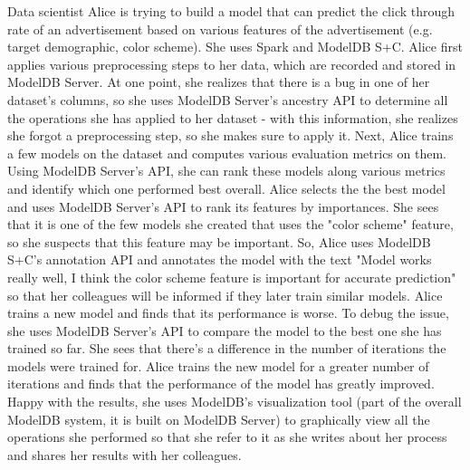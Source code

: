 Data scientist Alice is trying to build a model that can predict the click through rate
of an advertisement based on various features of the advertisement (e.g. target demographic,
color scheme). She uses Spark and ModelDB S+C. Alice first applies various preprocessing steps to
her data, which are recorded and stored in ModelDB Server. At one point, she realizes that there
is a bug in one of her dataset's columns, so she uses ModelDB Server's ancestry API to determine
all the operations she has applied to her dataset - with this information, she realizes she forgot a preprocessing step, so
she makes sure to apply it.
Next, Alice trains a few models on the dataset and computes various evaluation metrics on them. Using
ModelDB Server's API, she can rank these models along various metrics and identify which one performed
best overall. Alice selects the the best model and uses ModelDB Server's API to 
rank its features by importances. She sees that it is one of the few 
models she created that uses the "color scheme" feature, so she suspects 
that this feature may be important. So, Alice uses ModelDB S+C's annotation API and 
annotates the model with the text "Model works really well, I think the color scheme feature is
important for accurate prediction" so that her colleagues will be informed if they later train
similar models. Alice trains a new model and finds that its performance
is worse. To debug the issue, she uses ModelDB Server's API to compare the model
to the best one she has trained so far. She sees that there's a difference in the number of iterations
the models were trained for. Alice trains the new model for a greater number of iterations and finds
that the performance of the model has greatly improved. Happy with the results, she uses ModelDB's visualization
tool (part of the overall ModelDB system, it is built on ModelDB Server) to graphically view all the operations 
she performed so that she refer to it as she writes about her process and shares her results with her colleagues.

